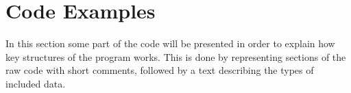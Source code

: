 \section{Code Examples}

In this section some part of the code will be presented in order to explain how key structures of the program works. This is done by representing sections of the raw code with short comments, followed by a text describing the types of included data.

